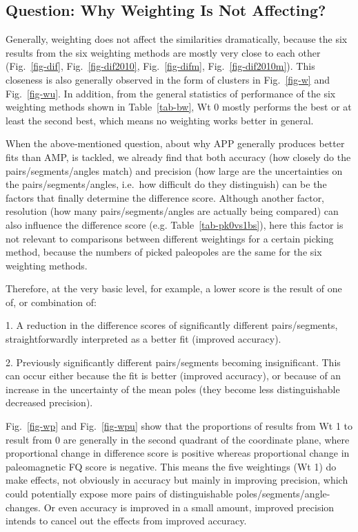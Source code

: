 \subsection{Question: Why Weighting Is Not Affecting?}

Generally, weighting does not affect the similarities dramatically, because the
six results from the six weighting methods are mostly very close to each other
(Fig.~\ref{fig-dif}, Fig.~\ref{fig-dif2010}, Fig.~\ref{fig-difm},
Fig.~\ref{fig-dif2010m}). This closeness is also generally observed in the form
of clusters in Fig.~\ref{fig-w} and Fig.~\ref{fig-wu}. In addition, from the
general statistics of performance of the six weighting methods shown in
Table~\ref{tab-bw}, Wt 0 mostly performs the best or at least the second best,
which means no weighting works better in general.

When the above-mentioned question, about why APP generally produces better fits
than AMP, is tackled, we already find that both accuracy (how closely do the
pairs/segments/angles match) and precision (how large are the uncertainties on
the pairs/segments/angles, i.e.\ how difficult do they distinguish) can be the
factors that finally determine the difference score. Although another factor,
resolution (how many pairs/segments/angles are actually being compared) can
also influence the difference score (e.g. Table~\ref{tab-pk0vs1bs}), here this
factor is not relevant to comparisons between different weightings for a certain
picking method, because the numbers of picked paleopoles are the same for the
six weighting methods.

Therefore, at the very basic level, for example, a lower score is the result of
one of, or combination of:

1. A reduction in the difference scores of significantly different
pairs/segments, straightforwardly interpreted as a better fit (improved
accuracy).

2. Previously significantly different pairs/segments becoming insignificant.
This can occur either because the fit is better (improved accuracy), or because
of an increase in the uncertainty of the mean poles (they become less
distinguishable \textemdash{} decreased precision).

Fig.~\ref{fig-wp} and Fig.~\ref{fig-wpu} show that the proportions of results
from Wt 1 to result from 0 are generally in the second quadrant of
the coordinate plane, where proportional change in difference score is positive
whereas proportional change in paleomagnetic FQ score is negative. This means
the five weightings (Wt 1) do make effects, not obviously in
accuracy but mainly in improving precision, which could potentially expose more
pairs of distinguishable poles/segments/angle-changes. Or even accuracy is
improved in a small amount, improved precision intends to cancel out the effects
from improved accuracy.

